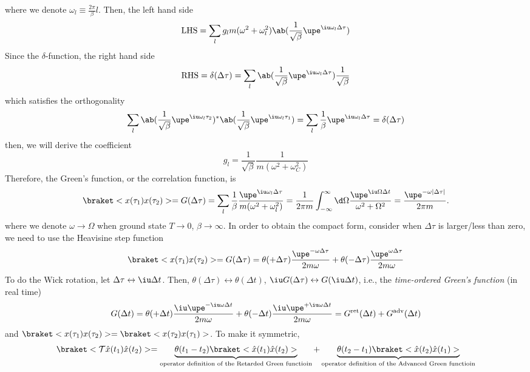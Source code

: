 where we denote $\omega_l \equiv \frac{2\pi}{\beta}l$.
Then, the left hand side
\[
  \text{LHS} = \sum_l g_l m(\omega^2 + \omega_l^2)
  \ab(\frac1{\sqrt\beta} \upe^{\iu\omega_l \Delta\tau})
\]
Since the $\delta$-function, the right hand side
\[
  \text{RHS} = \delta(\Delta\tau)
= \sum_l \ab(\frac1{\sqrt\beta} \upe^{\iu\omega_l\Delta\tau}) \frac1{\sqrt\beta}
\]
which satisfies the orthogonality
\[
  \sum_l \ab(\frac1{\sqrt\beta} \upe^{\iu\omega_l\tau_2})^*
         \ab(\frac1{\sqrt\beta} \upe^{\iu\omega_l\tau_1})
= \sum_l \frac1\beta \upe^{\iu\omega_l\Delta\tau} = \delta(\Delta\tau)
\]
then, we will derive the coefficient
\[
  g_l = \frac1{\sqrt\beta} \frac{1}{m(\omega^2 + \omega_C^2)}
\]
Therefore, the Green's function, or the correlation function, is
\begin{equation}
  \braket<x(\tau_1) x(\tau_2)> =
  G(\Delta\tau) = \sum_l \frac1\beta
                  \frac{\upe^{\iu\omega_l\Delta\tau}}{m(\omega^2 + \omega_l^2)}
= \frac1{2\pi m} \int_{-\infty}^\infty \d\Omega
  \frac{\upe^{\iu\Omega\Delta t}}{\omega^2 + \Omega^2}
= \frac{\upe^{-\omega|\Delta\tau|}}{2\pi m}.
\end{equation}
where we denote $\omega \to \Omega$ when ground state $T\to0$, $\beta\to\infty$.
In order to obtain the compact form, consider when $\Delta\tau$ is larger/less
than zero, we need to use the Heavisine step function
\begin{equation}
  \braket<x(\tau_1) x(\tau_2)> = G(\Delta\tau)
= \theta(+\Delta\tau) \frac{\upe^{-\omega\Delta\tau}}{2m\omega}
+ \theta(-\Delta\tau) \frac{\upe^{\omega\Delta\tau}}{2m\omega}
\end{equation}
To do the Wick rotation, let $\Delta\tau \leftrightarrow \iu\Delta t$.
Then, $\theta(\Delta\tau) \leftrightarrow \theta(\Delta t)$,
$\iu G(\Delta\tau) \leftrightarrow G(\iu\Delta t)$, i.e., the
\emph{time-ordered Green's function} (in real time)
\begin{equation}
  G(\Delta t) = \theta(+\Delta t) \frac{\iu\upe^{-\iu\omega\Delta t}}{2m\omega}
              + \theta(-\Delta t) \frac{\iu\upe^{+\iu\omega\Delta t}}{2m\omega}
              = G^\text{ret}(\Delta t) + G^\text{adv}(\Delta t)
\end{equation}
and $\braket<x(\tau_1)x(\tau_2)> = \braket<x(\tau_2)x(\tau_1)>$.
To make it symmetric,
\begin{equation}
  \braket<\mathcal T \hat x(t_1) \hat x(t_2)>
= \underbrace{\theta(t_1 - t_2) \braket<\hat x(t_1) \hat x(t_2)>}_
  \text{operator definition of the Retarded Green functioin} +
  \underbrace{\theta(t_2 - t_1) \braket<\hat x(t_2) \hat x(t_1)>}_
  \text{operator definition of the Advanced Green functioin}
\end{equation}
